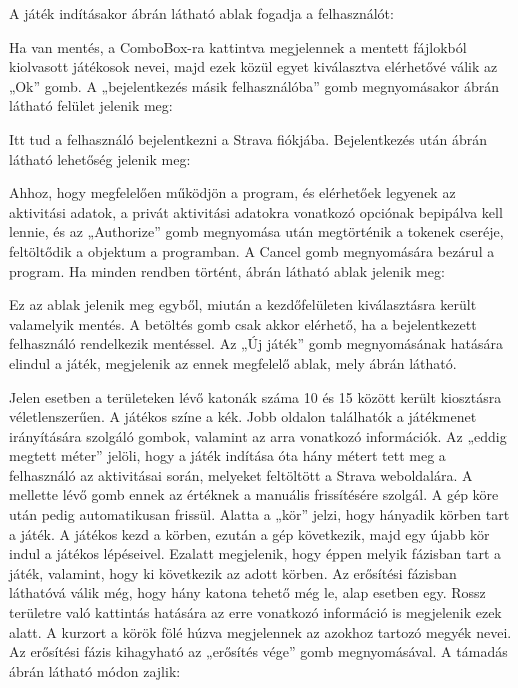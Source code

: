 A játék indításakor  ábrán látható ablak fogadja a felhasználót: 



Ha van mentés, a ComboBox-ra kattintva megjelennek a mentett fájlokból kiolvasott játékosok nevei, majd ezek közül egyet kiválasztva elérhetővé válik az „Ok” gomb.
A „bejelentkezés másik felhasználóba” gomb megnyomásakor  ábrán látható felület jelenik meg: 



Itt tud a felhasználó bejelentkezni a Strava fiókjába.
Bejelentkezés után  ábrán látható lehetőség jelenik meg: 




Ahhoz, hogy megfelelően működjön a program, és elérhetőek legyenek az aktivitási adatok, a privát aktivitási adatokra vonatkozó opciónak bepipálva kell lennie, és az „Authorize” gomb megnyomása után megtörténik a tokenek cseréje, feltöltődik a  objektum a programban.
A Cancel gomb megnyomására bezárul a program.
Ha minden rendben történt,  ábrán látható ablak jelenik meg: 



Ez az ablak jelenik meg egyből, miután a kezdőfelületen kiválasztásra került valamelyik mentés.
A betöltés gomb csak akkor elérhető, ha a bejelentkezett felhasználó rendelkezik mentéssel.
Az „Új játék” gomb megnyomásának hatására elindul a játék, megjelenik az ennek megfelelő ablak, mely  ábrán látható. 


Jelen esetben a területeken lévő katonák száma 10 és 15 között került kiosztásra véletlenszerűen.
A játékos színe a kék.
Jobb oldalon találhatók a játékmenet irányítására szolgáló gombok, valamint az arra vonatkozó információk.
Az „eddig megtett méter” jelöli, hogy a játék indítása óta hány métert tett meg a felhasználó az aktivitásai során, melyeket feltöltött a Strava weboldalára.
A mellette lévő gomb ennek az értéknek a manuális frissítésére szolgál.
A gép köre után pedig automatikusan frissül.
Alatta a „kör” jelzi, hogy hányadik körben tart a játék.
A játékos kezd a körben, ezután a gép következik, majd egy újabb kör indul a játékos lépéseivel.
Ezalatt megjelenik, hogy éppen melyik fázisban tart a játék, valamint, hogy ki következik az adott körben.
Az erősítési fázisban láthatóvá válik még, hogy hány katona tehető még le, alap esetben egy.
Rossz területre való kattintás hatására az erre vonatkozó információ is megjelenik ezek alatt.
A kurzort a körök fölé húzva megjelennek az azokhoz tartozó megyék nevei.
Az erősítési fázis kihagyható az „erősítés vége” gomb megnyomásával.
A támadás  ábrán látható módon zajlik: 

